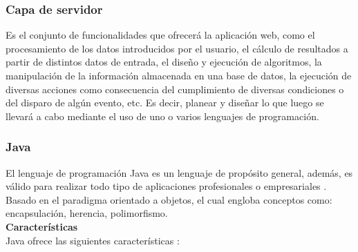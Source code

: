 %

\subsubsection{Capa de servidor}
\label{sec:capaProceso}

Es el conjunto de funcionalidades que ofrecerá la aplicación web, como el 
procesamiento de los datos introducidos por el usuario, el cálculo de resultados 
a partir de distintos datos de entrada, el diseño y ejecución de algoritmos, la 
manipulación de la información almacenada en una base de datos, la ejecución de 
diversas acciones como consecuencia del cumplimiento de diversas condiciones o 
del disparo de algún evento, etc. Es decir, planear y diseñar lo que luego se 
llevará a cabo mediante el uso de uno o varios lenguajes de programación.


\subsubsection{Java}
\label{sub:java}

El lenguaje de programación Java es un lenguaje de propósito general, además, es 
válido para realizar todo tipo de aplicaciones profesionales o empresariales 
\cite{lenguaje_java}. \\
Basado en el paradigma orientado a objetos, el cual engloba conceptos como: 
encapsulación, herencia, polimorfismo. \\

\textbf{Características} \\
Java ofrece las siguientes características \cite{lenguaje_java}:

